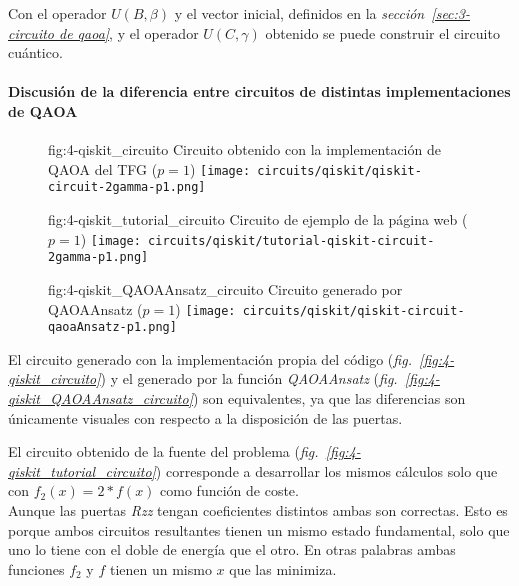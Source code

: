 Con el operador \(U(B, \beta)\) y el vector inicial, definidos en la \textit{sección~\ref{sec:3-circuito de qaoa}}, y el operador \(U(C, \gamma)\) obtenido se puede construir el circuito cuántico.

\paragraph{Discusión de la diferencia entre circuitos de distintas implementaciones de QAOA}

\begin{figure}[Circuito {--} max-cut en grafo de 4 aristas propio]{fig:4-qiskit_circuito}{ Circuito obtenido con la implementación de QAOA del TFG ($p=1$) }
  \centering
  \texttt{[image: circuits/qiskit/qiskit-circuit-2gamma-p1.png]}
\end{figure}

\begin{figure}[Circuito {--} max-cut en grafo de 4 aristas de la fuente]{fig:4-qiskit_tutorial_circuito}{ Circuito de ejemplo de la página web\cite{qiskit_tutorial_antiguo} ($p=1$) }
  \centering
  \texttt{[image: circuits/qiskit/tutorial-qiskit-circuit-2gamma-p1.png]}
\end{figure}

\begin{figure}[Circuito {--} max-cut en grafo de 4 aristas de QAOAAnsatz]{fig:4-qiskit_QAOAAnsatz_circuito}{ Circuito generado por QAOAAnsatz ($p=1$) }
  \centering
  \texttt{[image: circuits/qiskit/qiskit-circuit-qaoaAnsatz-p1.png]}
\end{figure}

El circuito generado con la implementación propia del código (\textit{fig.~\ref{fig:4-qiskit_circuito}}) y el generado por la función \textit{QAOAAnsatz} (\textit{fig.~\ref{fig:4-qiskit_QAOAAnsatz_circuito}}) son equivalentes, ya que las diferencias son únicamente visuales con respecto a la disposición de las puertas.

El circuito obtenido de la fuente del problema (\textit{fig.~\ref{fig:4-qiskit_tutorial_circuito}}) corresponde a desarrollar los mismos cálculos solo que con $f_2(x) = 2*f(x)$ como función de coste.
\\
Aunque las puertas \textit{Rzz} tengan coeficientes distintos ambas son correctas.
Esto es porque ambos circuitos resultantes tienen un mismo estado fundamental, solo que uno lo tiene con el doble de energía que el otro.
En otras palabras ambas funciones $f_2$ y $f$ tienen un mismo $x$ que las minimiza.


